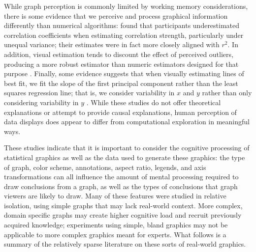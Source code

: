 \documentclass[11pt]{isuthesis}\usepackage[]{graphicx}\usepackage[]{color}
\begin{document}
While graph perception is commonly limited by working memory considerations, there is some evidence that we perceive and process graphical information differently than numerical algorithms: \citet{bobko1979perception} found that participants underestimated correlation coefficients when estimating correlation strength, particularly under unequal variance; their estimates were in fact more closely aligned with $r^2$. In addition, visual estimation tends to discount the effect of perceived outliers, producing a more robust estimator than numeric estimators designed for that purpose \citep{lewandowsky1989perception}. Finally, some evidence suggests that when visually estimating lines of best fit, we fit the slope of the first principal component rather than the least squares regression line; that is, we consider variability in $x$ and $y$ rather than only considering variability in $y$ \citep{mosteller1981eye}. While these studies do not offer theoretical explanations or attempt to provide causal explanations, human perception of data displays does appear to differ from computational exploration in meaningful ways. 

These studies indicate that it is important to consider the cognitive processing of statistical graphics as well as the data used to generate these graphics: the type of graph, color scheme, annotations, aspect ratio, legends, and axis transformations can all influence the amount of mental processing required to draw conclusions from a graph, as well as the types of conclusions that graph viewers are likely to draw. Many of these features were studied in relative isolation, using simple graphs that may lack real-world context. More complex, domain specific graphs may create higher cognitive load and recruit previously acquired knowledge; experiments using simple, bland graphics may not be applicable to more complex graphics meant for experts. What follows is a summary of the relatively sparse literature on these sorts of real-world graphics. 
\end{document}
